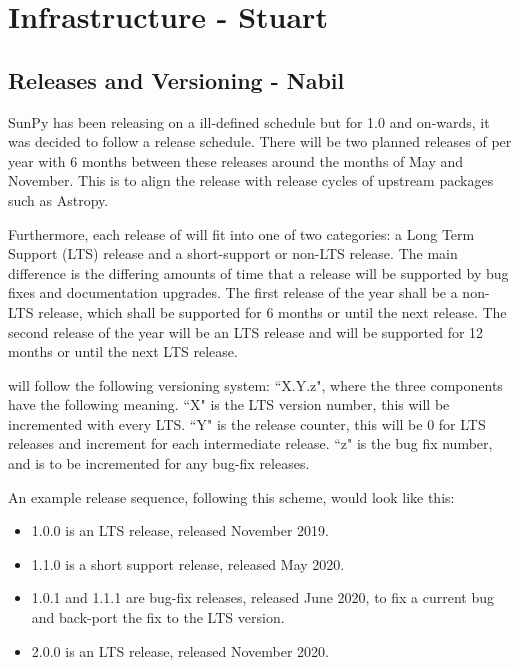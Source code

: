 \section{Infrastructure - Stuart}
\label{sec:infrastructure}

\subsection{Releases and Versioning - Nabil}

SunPy has been releasing on a ill-defined schedule but for 1.0 and on-wards, it was decided to follow a release schedule. 
There will be two planned releases of \sunpypkg per year with 6 months between these releases around the months of May and November.
This is to align the release with release cycles of upstream packages such as Astropy.

Furthermore, each release of \sunpypkg will fit into one of two categories: a Long Term Support (LTS) release and a short-support or non-LTS release.
The main difference is the differing amounts of time that a release will be supported by bug fixes and documentation upgrades. 
The first release of the year shall be a non-LTS release, which shall be supported for 6 months or until the next release.
The second release of the year will be an LTS release and will be supported for 12 months or until the next LTS release.

\sunpypkg will follow the following versioning system: ``X.Y.z", where the three components have the following meaning.
``X" is the LTS version number, this will be incremented with every LTS.
``Y" is the release counter, this will be 0 for LTS releases and increment for each intermediate release.
``z" is the bug fix number, and is to be incremented for any bug-fix releases.

An example release sequence, following this scheme, would look like this:

\begin{itemize}
\itemsep0em
\item 1.0.0 is an LTS release, released November 2019.
\item 1.1.0 is a short support release, released May 2020.
\item 1.0.1 and 1.1.1 are bug-fix releases, released June 2020, to fix a current bug and back-port the fix to the LTS version.
\item 2.0.0 is an LTS release, released November 2020.
\end{itemize}

